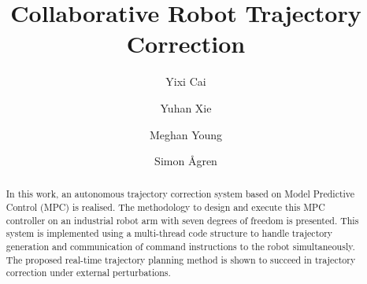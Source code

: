 \documentclass[final]{LTHtwocol} %
\begin{document}
\begin{frontmatter}
\title{Collaborative Robot Trajectory Correction} %

\author[yixi]{Yixi Cai}
\author[yuhan]{Yuhan Xie}
\author[meghan]{Meghan Young}
\author[simon]{Simon Ågren}



\begin{abstract}
In this work, an autonomous trajectory correction system based on Model Predictive Control (MPC) is realised. The methodology to design and execute this MPC controller on an industrial robot arm with seven degrees of freedom is presented. This system is implemented using a multi-thread code structure to handle trajectory generation and communication of command instructions to the robot simultaneously. The proposed real-time trajectory planning method is shown to succeed in trajectory correction under external perturbations.

\end{abstract}

\end{frontmatter}


\end{document}
